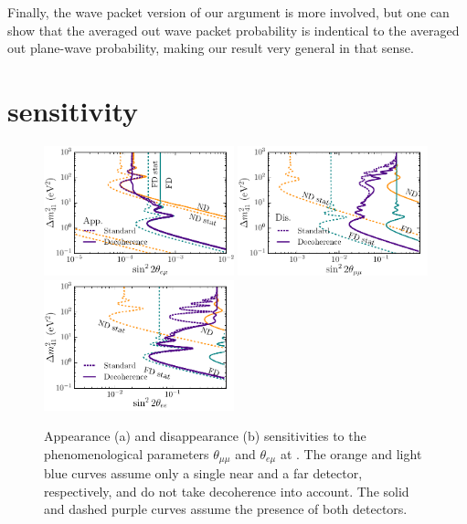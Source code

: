 Finally, the wave packet version of our argument is more involved, but one can show that the averaged out wave packet probability is indentical to the averaged out plane-wave probability, making our result very general in that sense.




\section{\nus sensitivity}


\begin{figure}
\includegraphics[width=0.49\textwidth]{figs/NDFD_Shape_app.pdf}
\includegraphics[width=0.49\textwidth]{figs/NDFD_Shape_dis.pdf}
\includegraphics[width=0.49\textwidth]{figs/NDFD_Shape_edis.pdf}
\caption{Appearance (a) and disappearance (b) sensitivities to the phenomenological parameters $\theta_{\mu \mu}$ and $\theta_{e \mu}$ at \nus. The orange and light blue curves assume only a single near and a far detector, respectively, and do not take decoherence into account. The solid and dashed purple curves assume the presence of both detectors. %
\label{fig:3+1sens}}
\end{figure}
%

